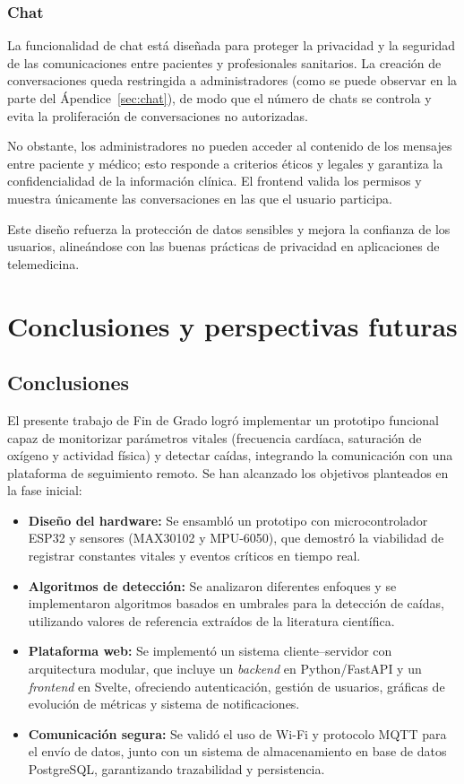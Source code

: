 \documentclass[12pt, a4paper]{article}
\begin{document}
\subsubsection{Chat}

La funcionalidad de chat está diseñada para proteger la privacidad y la seguridad de las comunicaciones entre pacientes y profesionales sanitarios. La creación de conversaciones queda restringida a administradores (como se puede observar en la parte del Ápendice~\ref{sec:chat}), de modo que el número de chats se controla y evita la proliferación de conversaciones no autorizadas.  

No obstante, los administradores no pueden acceder al contenido de los mensajes entre paciente y médico; esto responde a criterios éticos y legales y garantiza la confidencialidad de la información clínica. El frontend valida los permisos y muestra únicamente las conversaciones en las que el usuario participa.  

Este diseño refuerza la protección de datos sensibles y mejora la confianza de los usuarios, alineándose con las buenas prácticas de privacidad en aplicaciones de telemedicina.


\section{Conclusiones y perspectivas futuras}
\subsection{Conclusiones}
El presente trabajo de Fin de Grado logró implementar un prototipo funcional capaz de monitorizar parámetros vitales (frecuencia cardíaca, saturación de oxígeno y actividad física) y detectar caídas, integrando la comunicación con una plataforma de seguimiento remoto. Se han alcanzado los objetivos planteados en la fase inicial:

\begin{itemize}
	\item \textbf{Diseño del hardware:} Se ensambló un prototipo con microcontrolador ESP32 y sensores (MAX30102 y MPU-6050), que demostró la viabilidad de registrar constantes vitales y eventos críticos en tiempo real.
	\item \textbf{Algoritmos de detección:} Se analizaron diferentes enfoques y se implementaron algoritmos basados en umbrales para la detección de caídas, utilizando valores de referencia extraídos de la literatura científica.
	\item \textbf{Plataforma web:} Se implementó un sistema cliente–servidor con arquitectura modular, que incluye un \emph{backend} en Python/FastAPI y un \emph{frontend} en Svelte, ofreciendo autenticación, gestión de usuarios, gráficas de evolución de métricas y sistema de notificaciones.
	\item \textbf{Comunicación segura:} Se validó el uso de Wi-Fi y protocolo MQTT para el envío de datos, junto con un sistema de almacenamiento en base de datos PostgreSQL, garantizando trazabilidad y persistencia.
\end{itemize}
\end{document}
